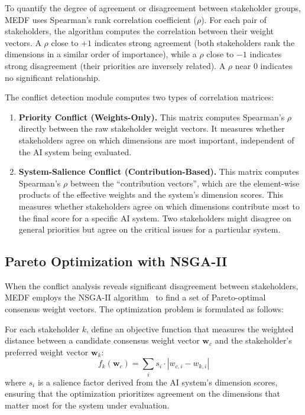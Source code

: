 To quantify the degree of agreement or disagreement between stakeholder groups, MEDF uses Spearman's rank correlation coefficient ($\rho$). For each pair of stakeholders, the algorithm computes the correlation between their weight vectors. A $\rho$ close to $+1$ indicates strong agreement (both stakeholders rank the dimensions in a similar order of importance), while a $\rho$ close to $-1$ indicates strong disagreement (their priorities are inversely related). A $\rho$ near $0$ indicates no significant relationship.

The conflict detection module computes two types of correlation matrices:

\begin{enumerate}[leftmargin=2em]
  \item \textbf{Priority Conflict (Weights-Only).} This matrix computes Spearman's $\rho$ directly between the raw stakeholder weight vectors. It measures whether stakeholders agree on which dimensions are most important, independent of the AI system being evaluated.

  \item \textbf{System-Salience Conflict (Contribution-Based).} This matrix computes Spearman's $\rho$ between the \enquote{contribution vectors}, which are the element-wise products of the effective weights and the system's dimension scores. This measures whether stakeholders agree on which dimensions contribute most to the final score for a specific AI system. Two stakeholders might disagree on general priorities but agree on the critical issues for a particular system.
\end{enumerate}

\subsection{Pareto Optimization with NSGA-II}
\label{sec:pareto}

When the conflict analysis reveals significant disagreement between stakeholders, MEDF employs the NSGA-II algorithm~\cite{deb2002nsga2} to find a set of Pareto-optimal consensus weight vectors. The optimization problem is formulated as follows:

For each stakeholder $k$, define an objective function that measures the weighted distance between a candidate consensus weight vector $\mathbf{w}_c$ and the stakeholder's preferred weight vector $\mathbf{w}_k$:
\begin{equation}
  f_k(\mathbf{w}_c) = \sum_{i} s_i \cdot |w_{c,i} - w_{k,i}|
  \label{eq:pareto_obj}
\end{equation}
where $s_i$ is a salience factor derived from the AI system's dimension scores, ensuring that the optimization prioritizes agreement on the dimensions that matter most for the system under evaluation.

